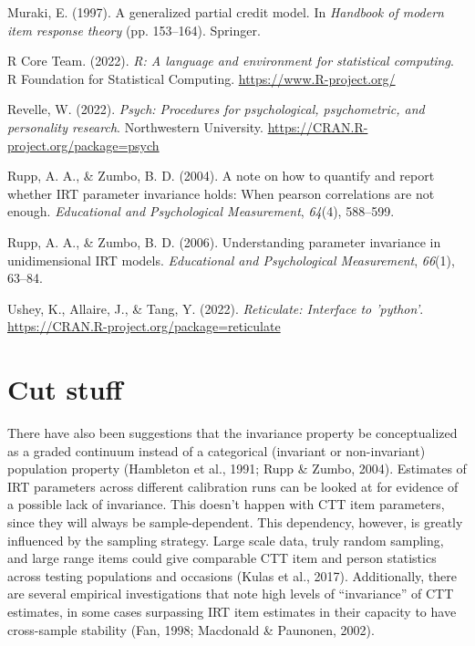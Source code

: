 \documentclass[
  man]{apa6}
\newlength{\cslhangindent}
\newlength{\cslentryspacingunit} %
\newenvironment{CSLReferences}[2] %
 {%
  \setlength{\parindent}{0pt}
  \ifodd #1
  \let\oldpar\par
  \def\par{\hangindent=\cslhangindent\oldpar}
  \fi
  \setlength{\parskip}{#2\cslentryspacingunit}
 }%
 {}
\begin{document}
\begin{CSLReferences}{1}{0}
\leavevmode{}%
Muraki, E. (1997). A generalized partial credit model. In \emph{Handbook of modern item response theory} (pp. 153--164). Springer.

\leavevmode{}%
R Core Team. (2022). \emph{R: A language and environment for statistical computing}. R Foundation for Statistical Computing. \url{https://www.R-project.org/}

\leavevmode{}%
Revelle, W. (2022). \emph{Psych: Procedures for psychological, psychometric, and personality research}. Northwestern University. \url{https://CRAN.R-project.org/package=psych}

\leavevmode{}%
Rupp, A. A., \& Zumbo, B. D. (2004). A note on how to quantify and report whether IRT parameter invariance holds: When pearson correlations are not enough. \emph{Educational and Psychological Measurement}, \emph{64}(4), 588--599.

\leavevmode{}%
Rupp, A. A., \& Zumbo, B. D. (2006). Understanding parameter invariance in unidimensional IRT models. \emph{Educational and Psychological Measurement}, \emph{66}(1), 63--84.

\leavevmode{}%
Ushey, K., Allaire, J., \& Tang, Y. (2022). \emph{Reticulate: Interface to 'python'}. \url{https://CRAN.R-project.org/package=reticulate}

\end{CSLReferences}

\endgroup

\hypertarget{appendix-appendices}{%
\appendix}


\hypertarget{cut-stuff}{%
\section{Cut stuff}\label{cut-stuff}}

There have also been suggestions that the invariance property be conceptualized as a graded continuum instead of a categorical (invariant or non-invariant) population property (Hambleton et al., 1991; Rupp \& Zumbo, 2004). Estimates of IRT parameters across different calibration runs can be looked at for evidence of a possible lack of invariance. This doesn't happen with CTT item parameters, since they will always be sample-dependent. This dependency, however, is greatly influenced by the sampling strategy. Large scale data, truly random sampling, and large range items could give comparable CTT item and person statistics across testing populations and occasions (Kulas et al., 2017). Additionally, there are several empirical investigations that note high levels of ``invariance'' of CTT estimates, in some cases surpassing IRT item estimates in their capacity to have cross-sample stability (Fan, 1998; Macdonald \& Paunonen, 2002).
\end{document}
